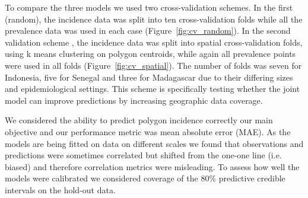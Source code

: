 \documentclass{statsoc}
\begin{document}
To compare the three models we used two cross-validation schemes. 
In the first (random), the incidence data was split into ten cross-validation folds while all the prevalence data was used in each case (Figure~\ref{fig:cv_random}). 
In the second validation scheme , the incidence data was split into spatial cross-validation folds, using k means clustering on polygon centroids, while again all prevalence points were used in all folds (Figure~\ref{fig:cv_spatial}).
The number of folds was seven for Indonesia, five for Senegal and three for Madagascar due to their differing sizes and epidemiological settings.
This scheme is specifically testing whether the joint model can improve predictions by increasing geographic data coverage.


We considered the ability to predict polygon incidence correctly our main objective and our performance metric was mean absolute error (MAE).
As the models are being fitted on data on different scales we found that observations and predictions were sometimes correlated but shifted from the one-one line (i.e. biased) and therefore correlation metrics were misleading.
To assess how well the models were calibrated we considered coverage of the 80\% predictive credible intervals on the hold-out data.



\begin{table}
\caption{\label{table1}Summary of out-of-sample accuracy for all three cross-validation experiments. Mean absolute error of predicted incidence rate against out-of-sample observed data for three countries.}
\centering
{}
\end{table}
\end{document}
